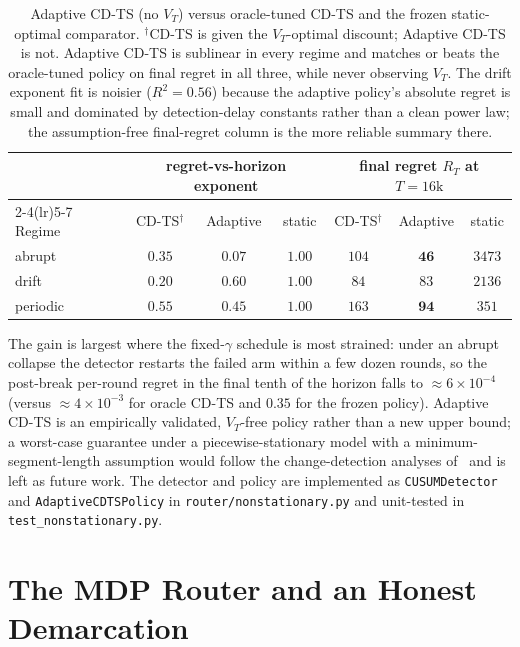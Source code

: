 \documentclass[11pt]{article}
\theoremstyle{definition}
\begin{document}
\begin{table}[h]
\centering
\begin{tabular}{lcccccc}
\toprule
 & \multicolumn{3}{c}{regret-vs-horizon exponent} & \multicolumn{3}{c}{final regret $R_T$ at $T{=}16\mathrm{k}$} \\
\cmidrule(lr){2-4}\cmidrule(lr){5-7}
Regime & CD-TS$^\dagger$ & Adaptive & static & CD-TS$^\dagger$ & Adaptive & static \\
\midrule
abrupt   & $0.35$ & $\mathbf{0.07}$ & $1.00$ & $104$ & $\mathbf{46}$ & $3473$ \\
drift    & $0.20$ & $0.60$ & $1.00$ & $84$  & $83$ & $2136$ \\
periodic & $0.55$ & $\mathbf{0.45}$ & $1.00$ & $163$ & $\mathbf{94}$ & $351$ \\
\bottomrule
\end{tabular}
\caption{Adaptive CD-TS (no $V_T$) versus oracle-tuned CD-TS and the frozen
static-optimal comparator. $^\dagger$CD-TS is given the $V_T$-optimal discount;
Adaptive CD-TS is not. Adaptive CD-TS is sublinear in every regime and matches
or beats the oracle-tuned policy on final regret in all three, while never
observing $V_T$. The drift exponent fit is noisier ($R^2{=}0.56$) because the
adaptive policy's absolute regret is small and dominated by detection-delay
constants rather than a clean power law; the assumption-free final-regret column
is the more reliable summary there.}
\label{tab:adaptive}
\end{table}

The gain is largest where the fixed-$\gamma$ schedule is most strained: under an
abrupt collapse the detector restarts the failed arm within a few dozen rounds,
so the post-break per-round regret in the final tenth of the horizon falls to
$\approx 6\times 10^{-4}$ (versus $\approx 4\times 10^{-3}$ for oracle CD-TS and
$0.35$ for the frozen policy). Adaptive CD-TS is an empirically validated,
$V_T$-free policy rather than a new upper bound; a worst-case guarantee under a
piecewise-stationary model with a minimum-segment-length assumption would follow
the change-detection analyses of~\cite{liu2018change,cao2019nearly} and is left
as future work. The detector and policy are implemented as
\texttt{CUSUMDetector} and \texttt{AdaptiveCDTSPolicy} in
\texttt{router/nonstationary.py} and unit-tested in \texttt{test\_nonstationary.py}.

\section{The MDP Router and an Honest Demarcation}
\label{sec:mdp}
\end{document}
